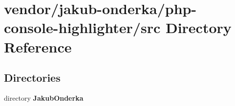 \section{vendor/jakub-\/onderka/php-\/console-\/highlighter/src Directory Reference}
\label{dir_e7d54bc04112e00820fba4a9b8485ccd}
\subsection*{Directories}
\begin{DoxyCompactItemize}
\item 
directory {\bf Jakub\+Onderka}
\end{DoxyCompactItemize}
